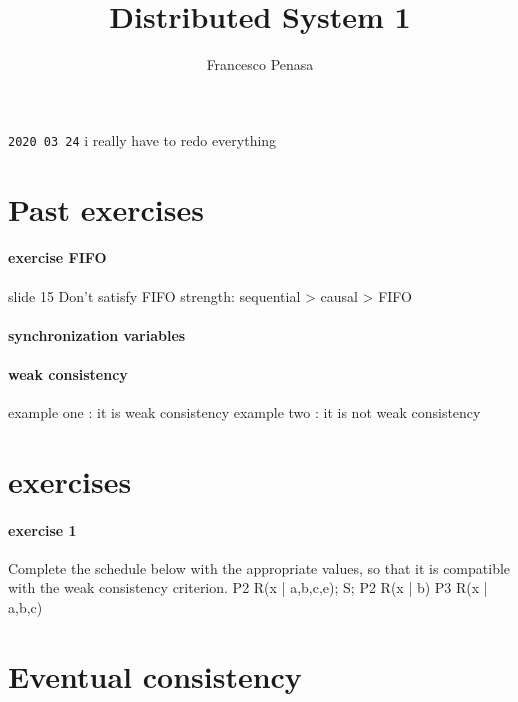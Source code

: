 \documentclass[11pt]{article}
\begin{document}
\author{Francesco Penasa}
\title{Distributed System 1}
\maketitle

\medskip

\texttt{2020 03 24}
i really have to redo everything
\section{Past exercises} %
\label{sec:past_exercises}
\paragraph{exercise FIFO} %
\label{par:exercise_fifo}
slide 15
Don't satisfy FIFO
strength: sequential > causal > FIFO


\paragraph{synchronization variables} %
\label{par:synchronization_variables}


\paragraph{weak consistency} %
\label{par:weak_consistency}
example one : it is weak consistency
example two : it is not weak consistency

\section{exercises} %
\label{sec:exercises}
\paragraph{exercise 1} %
\label{par:exercise_1}
Complete the schedule below with the appropriate values, so that it is compatible with the weak consistency criterion.
P2 R(x | a,b,c,e); S; P2 R(x | b)
P3 R(x | a,b,c)

\section{Eventual consistency} %
\label{sec:eventual_consistency}
\end{document}

